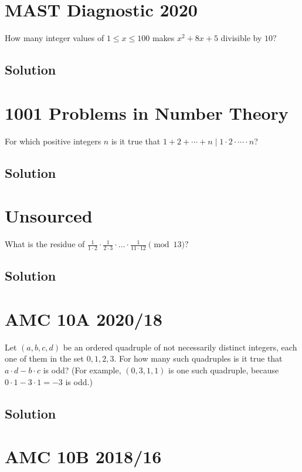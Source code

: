 \documentclass[mast]{lucky}
\begin{document}
\pagebreak\section{MAST Diagnostic 2020}

How many integer values of $1\leq x\leq 100$ makes $x^2+8x+5$ divisible by $10?$

\subsection{Solution}

\pagebreak\section{1001 Problems in Number Theory}

For which positive integers $n$ is it true that $1+2+\cdots+n\mid 1\cdot 2\cdot \cdots \cdot n$?

\subsection{Solution}

\pagebreak\section{Unsourced}

What is the residue of $\frac{1}{1\cdot 2}\cdot \frac{1}{2\cdot 3}\cdot \dots \cdot \frac{1}{11\cdot 12}\pmod {13}?$

\subsection{Solution}

\pagebreak\section{AMC 10A 2020/18}

Let $(a,b,c,d)$ be an ordered quadruple of not necessarily distinct integers, each one of them in the set ${0,1,2,3}.$ For how many such quadruples is it true that $a\cdot d-b\cdot c$ is odd? (For example, $(0,3,1,1)$ is one such quadruple, because $0\cdot 1-3\cdot 1 = -3$ is odd.)

\subsection{Solution}

\pagebreak\section{AMC 10B 2018/16}
\end{document}
